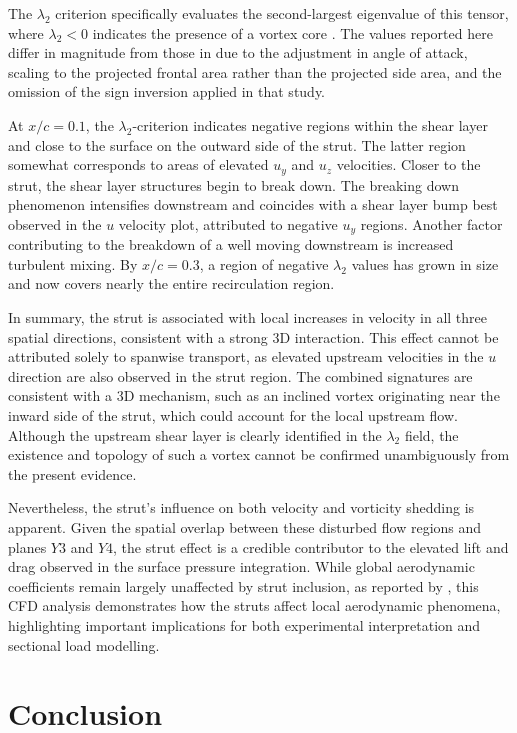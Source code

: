 \documentclass[wes, manuscript]{copernicus}
\begin{document}
The $\lambda_2$ criterion specifically evaluates the second-largest eigenvalue of this tensor, where $\lambda_2 < 0$ indicates the presence of a vortex core \citep{Jeong1995}. The values reported here differ in magnitude from those in \cite{Vire2022} due to the adjustment in angle of attack, scaling to the projected frontal area rather than the projected side area, and the omission of the sign inversion applied in that study.

At $x/c = 0.1$, the $\lambda_2$-criterion indicates negative regions within the shear layer and close to the surface on the outward side of the strut. The latter region somewhat corresponds to areas of elevated $u_{y}$ and $u_{z}$ velocities. Closer to the strut, the shear layer structures begin to break down. The breaking down phenomenon intensifies downstream and coincides with a shear layer bump best observed in the $u$ velocity plot, attributed to negative $u_{y}$ regions. Another factor contributing to the breakdown of a well moving downstream is increased turbulent mixing. By $x/c = 0.3$, a region of negative $\lambda_2$ values has grown in size and now covers nearly the entire recirculation region.

In summary, the strut is associated with local increases in velocity in all three spatial directions, consistent with a strong 3D interaction. This effect cannot be attributed solely to spanwise transport, as elevated upstream velocities in the $u$ direction are also observed in the strut region. The combined signatures are consistent with a 3D mechanism, such as an inclined vortex originating near the inward side of the strut, which could account for the local upstream flow. Although the upstream shear layer is clearly identified in the $\lambda_2$ field, the existence and topology of such a vortex cannot be confirmed unambiguously from the present evidence.

Nevertheless, the strut’s influence on both velocity and vorticity shedding is apparent. Given the spatial overlap between these disturbed flow regions and planes $Y3$ and $Y4$, the strut effect is a credible contributor to the elevated lift and drag observed in the surface pressure integration. While global aerodynamic coefficients remain largely unaffected by strut inclusion, as reported by \citep{Vire2022}, this CFD analysis demonstrates how the struts affect local aerodynamic phenomena, highlighting important implications for both experimental interpretation and sectional load modelling.
%
\section{Conclusion}\label{sec:conclusion}
%
\end{document}
